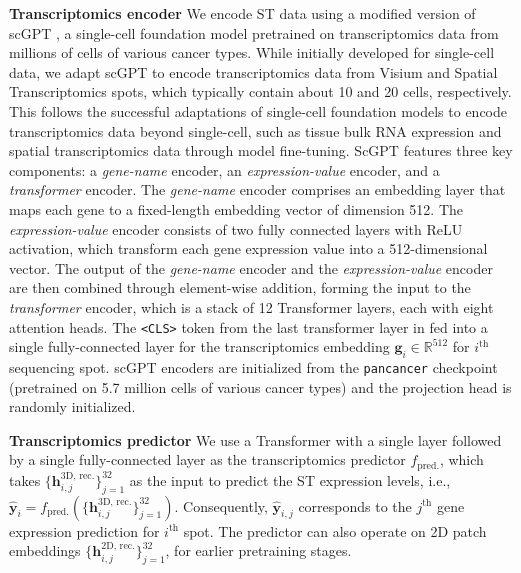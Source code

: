 \noindent\textbf{Transcriptomics encoder}
We encode ST data using a modified version of scGPT \cite{cui2024scgpt}, a single-cell foundation model pretrained on transcriptomics data from millions of cells of various cancer types. While initially developed for single-cell data, we adapt scGPT to encode transcriptomics data from Visium and Spatial Transcriptomics spots, which typically contain about 10 and 20 cells, respectively\cite{elosua2021spotlight}. This follows the successful adaptations of single-cell foundation models to encode transcriptomics data beyond single-cell, such as tissue bulk RNA expression and spatial transcriptomics data through model fine-tuning\cite{vaidya2025molecular,lee2024pathomclip}. ScGPT features three key components: a \textit{gene-name} encoder, an \textit{expression-value} encoder, and a \textit{transformer} encoder. The \textit{gene-name} encoder comprises an embedding layer that maps each gene to a fixed-length embedding vector of dimension 512. The \textit{expression-value} encoder consists of two fully connected layers with ReLU activation, which transform each gene expression value into a 512-dimensional vector. The output of the \textit{gene-name} encoder and the \textit{expression-value} encoder are then combined through element-wise addition, forming the input to the \textit{transformer} encoder, which is a stack of 12 Transformer layers, each with eight attention heads. The \texttt{<CLS>} token from the last transformer layer in fed into a single fully-connected layer for the transcriptomics embedding $\mathbf{g}_i\in\mathbb{R}^{512}$ for $i^{\text{th}}$ sequencing spot.
scGPT encoders are initialized from the \texttt{pancancer} checkpoint (pretrained on 5.7 million cells of various cancer types) and the projection head is randomly initialized.

\noindent\textbf{Transcriptomics predictor} We use a Transformer with a single layer followed by a single fully-connected layer as the transcriptomics predictor $f_{\text{pred.}}$, which takes $\{\mathbf{h}_{i,j}^{\text{3D, rec.}}\}_{j=1}^{32}$ as the input to predict the ST expression levels, i.e., $\widehat{\mathbf{y}}_i = f_{\text{pred.}}(\{\mathbf{h}_{i,j}^{\text{3D, rec.}}\}_{j=1}^{32})$. Consequently, $\widehat{\mathbf{y}}_{i,j}$ corresponds to the $j^{\text{th}}$ gene expression prediction for $i^{\text{th}}$ spot. The predictor can also operate on 2D patch embeddings $\{\mathbf{h}_{i,j}^{\text{2D, rec.}}\}_{j=1}^{32}$, for earlier pretraining stages.


